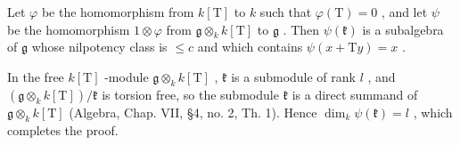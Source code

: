 Let \(\varphi\) be the homomorphism from \(k[\mathrm{T}]\) to \(k\) such that \(\varphi (\mathrm{T}) = 0\) , and let \(\psi\) be the homomorphism \(1\otimes \varphi\) from \(\mathfrak{g}\otimes_k k[\mathrm{T}]\) to \(\mathfrak{g}\) . Then \(\psi (\mathfrak{k})\) is a subalgebra of \(\mathfrak{g}\) whose nilpotency class is \(\leq c\) and which contains \(\psi (x + \mathrm{T}y) = x\) .

In the free \(k[\mathrm{T}]\) -module \(\mathfrak{g} \otimes_k k[\mathrm{T}]\) , \(\mathfrak{k}\) is a submodule of rank \(l\) , and \((\mathfrak{g} \otimes_k k[\mathrm{T}]) / \mathfrak{k}\) is torsion free, so the submodule \(\mathfrak{k}\) is a direct summand of \(\mathfrak{g} \otimes_k k[\mathrm{T}]\) (Algebra, Chap. VII, §4, no. 2, Th. 1). Hence \(\dim_k \psi(\mathfrak{k}) = l\) , which completes the proof.
\relax{}
